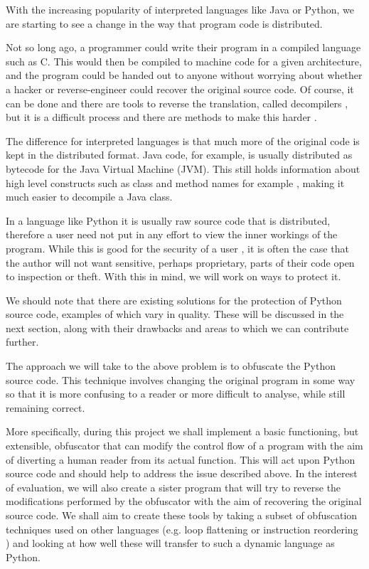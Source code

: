 \documentclass{report}
\begin{document}
With the increasing popularity of interpreted languages like Java or Python, we are starting
to see a change in the way that program code is distributed.

Not so long ago, a programmer could write their program in a compiled language such as C. This would then be compiled
to machine code for a given architecture, and the program could be handed out to anyone without
worrying about whether a hacker or reverse-engineer could recover the original source code.
Of course, it can be done and there are tools to reverse the translation, called decompilers \cite{cdecomp}, but it
is a difficult process and there are methods to make this harder \cite{disres}.

The difference for interpreted languages is that much more of the original code is kept in the
distributed format. Java code, for example, is usually distributed as bytecode for the Java Virtual
Machine (JVM). This still holds information about high level constructs such as class and method names for example \cite{classinfo},
making it much easier to decompile a Java class.

In a language like Python it is usually raw source code that is distributed, therefore a
user need not put in any effort to view the inner workings of the program. While this is good
for the security of a user \cite{noobf}, it is often the case that the author will not want sensitive,
perhaps proprietary, parts of their code open to inspection or theft. With this in mind, we will work on ways to protect it.

We should note that there are existing solutions for the protection of Python source code, examples of which vary in quality.
These will be discussed in the next section, along with their drawbacks and areas to which we can contribute further.

The approach we will take to the above problem is to obfuscate the Python source code. This technique involves changing the
original program in some way so that it is more confusing to a reader or more difficult to analyse, while still remaining correct.

More specifically, during this project we shall implement a basic functioning, but extensible, obfuscator
that can modify the control flow of a program with the aim of diverting a human reader from its actual
function. This will act upon Python source code and should help to address the issue described above.
In the interest of evaluation, we will also create a sister program that will try to reverse the modifications performed by the
obfuscator with the aim of recovering the original source code. 
We shall aim to create these tools by taking a subset of obfuscation techniques used on other languages (e.g.
loop flattening or instruction reordering \cite{taxobftrans}) and looking at how well these will transfer to such a dynamic language as Python.
\end{document}
